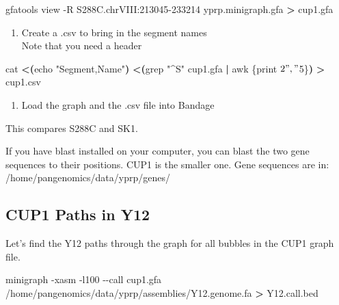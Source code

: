 \documentclass[
]{book}
\newenvironment{Shaded}{\begin{snugshade}}{\end{snugshade}}
\newcommand{\AttributeTok}[1]{\textcolor[rgb]{0.77,0.63,0.00}{#1}}
\newcommand{\BuiltInTok}[1]{#1}
\newcommand{\ExtensionTok}[1]{#1}
\newcommand{\FunctionTok}[1]{\textcolor[rgb]{0.00,0.00,0.00}{#1}}
\newcommand{\KeywordTok}[1]{\textcolor[rgb]{0.13,0.29,0.53}{\textbf{#1}}}
\newcommand{\NormalTok}[1]{#1}
\newcommand{\OperatorTok}[1]{\textcolor[rgb]{0.81,0.36,0.00}{\textbf{#1}}}
\newcommand{\StringTok}[1]{\textcolor[rgb]{0.31,0.60,0.02}{#1}}
\providecommand{\tightlist}{%
  \setlength{\itemsep}{0pt}\setlength{\parskip}{0pt}}
\begin{document}
\begin{Shaded}
\begin{Highlighting}[]
\ExtensionTok{gfatools}\NormalTok{ view }\AttributeTok{{-}R}\NormalTok{ S288C.chrVIII:213045{-}233214 yprp.minigraph.gfa }\OperatorTok{\textgreater{}}\NormalTok{ cup1.gfa}
\end{Highlighting}
\end{Shaded}

\begin{enumerate}
\def\labelenumi{\arabic{enumi}.}
\setcounter{enumi}{1}
\tightlist
\item
  Create a .csv to bring in the segment names\\
  Note that you need a header
\end{enumerate}

\begin{Shaded}
\begin{Highlighting}[]
 \FunctionTok{cat} \OperatorTok{\textless{}(}\BuiltInTok{echo} \StringTok{"Segment,Name"}\OperatorTok{)} \OperatorTok{\textless{}(}\FunctionTok{grep} \StringTok{"\^{}S"}\NormalTok{ cup1.gfa }\KeywordTok{|} \FunctionTok{awk} \StringTok{\textquotesingle{}\{print $2 "," $5\}\textquotesingle{}}\OperatorTok{)} \OperatorTok{\textgreater{}}\NormalTok{ cup1.csv}
\end{Highlighting}
\end{Shaded}

\begin{enumerate}
\def\labelenumi{\arabic{enumi}.}
\setcounter{enumi}{2}
\tightlist
\item
  Load the graph and the .csv file into Bandage
\end{enumerate}

This compares S288C and SK1.

If you have blast installed on your computer, you can blast the two gene sequences to their positions. CUP1 is the smaller one. Gene sequences are in: /home/pangenomics/data/yprp/genes/

\hypertarget{cup1-paths-in-y12}{%
\subsection*{CUP1 Paths in Y12}\label{cup1-paths-in-y12}}

Let's find the Y12 paths through the graph for all bubbles in the CUP1 graph file.

\begin{Shaded}
\begin{Highlighting}[]
\ExtensionTok{minigraph} \AttributeTok{{-}xasm} \AttributeTok{{-}l100} \AttributeTok{{-}{-}call}\NormalTok{ cup1.gfa /home/pangenomics/data/yprp/assemblies/Y12.genome.fa }\OperatorTok{\textgreater{}}\NormalTok{ Y12.call.bed}
\end{Highlighting}
\end{Shaded}
\end{document}

